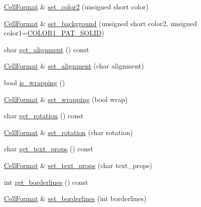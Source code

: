 \begin{DoxyCompactItemize}
\hyperlink{struct_excel_format_1_1_cell_format}{Cell\+Format} \& \hyperlink{struct_excel_format_1_1_cell_format_a072d07c3d52c584176f17a4d13a0d873}{set\+\_\+color2} (unsigned short color)
\item 
\hyperlink{struct_excel_format_1_1_cell_format}{Cell\+Format} \& \hyperlink{struct_excel_format_1_1_cell_format_ac77a06cfd205a5ffd2ef5634fda143fc}{set\+\_\+background} (unsigned short color2, unsigned color1=\hyperlink{namespace_excel_format_ac32635705247b08ca94547c6d08b9f2fa10706675844e1f7f20012859838a1409}{C\+O\+L\+O\+R1\+\_\+\+P\+A\+T\+\_\+\+S\+O\+L\+I\+D})
\item 
char \hyperlink{struct_excel_format_1_1_cell_format_ad7f9a98c1f288ec442caf1964a78394b}{get\+\_\+alignment} () const 
\item 
\hyperlink{struct_excel_format_1_1_cell_format}{Cell\+Format} \& \hyperlink{struct_excel_format_1_1_cell_format_a4de90d5c3b6093581df4e93253f7e7fd}{set\+\_\+alignment} (char alignment)
\item 
bool \hyperlink{struct_excel_format_1_1_cell_format_ae982edb095d1a18b2c415a444ac64ec4}{is\+\_\+wrapping} ()
\item 
\hyperlink{struct_excel_format_1_1_cell_format}{Cell\+Format} \& \hyperlink{struct_excel_format_1_1_cell_format_a63101baf36c420d84d0637b4c1892e3b}{set\+\_\+wrapping} (bool wrap)
\item 
char \hyperlink{struct_excel_format_1_1_cell_format_a77cf40136e6c4b952a2a8fa6cd3e896d}{get\+\_\+rotation} () const 
\item 
\hyperlink{struct_excel_format_1_1_cell_format}{Cell\+Format} \& \hyperlink{struct_excel_format_1_1_cell_format_a092034fdd56421959ff1f5b62f48def7}{set\+\_\+rotation} (char rotation)
\item 
char \hyperlink{struct_excel_format_1_1_cell_format_a9205093a5e79bf88c12e44f5a29ce834}{get\+\_\+text\+\_\+props} () const 
\item 
\hyperlink{struct_excel_format_1_1_cell_format}{Cell\+Format} \& \hyperlink{struct_excel_format_1_1_cell_format_a10bec37cc0c639ba5101788e6e395d82}{set\+\_\+text\+\_\+props} (char text\+\_\+props)
\item 
int \hyperlink{struct_excel_format_1_1_cell_format_ad9ee83cc3d243323f5032638c63bdb3d}{get\+\_\+borderlines} () const 
\item 
\hyperlink{struct_excel_format_1_1_cell_format}{Cell\+Format} \& \hyperlink{struct_excel_format_1_1_cell_format_a9ae656edccfa8869fdf27f3ea87b212a}{set\+\_\+borderlines} (int borderlines)
\item 

\end{DoxyCompactItemize}
